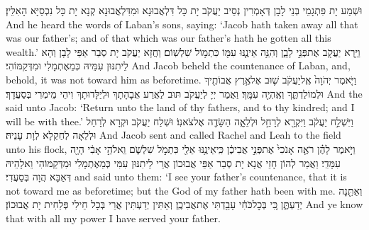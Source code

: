 {וּשְׁמַע יָת פִּתְגָמֵי בְּנֵי לָבָן דְּאָמְרִין נְסֵיב יַעֲקֹב יָת כָּל דִּלְאֲבוּנָא וּמִדִּלְאֲבוּנָא קְנָא יָת כָּל נִכְסַיָּא הָאִלֵּין׃}
{And he heard the words of Laban’s sons, saying: ‘Jacob hath taken away all that was our father’s; and of that which was our father’s hath he gotten all this wealth.’}{}
{וַיַּ֥רְא יַעֲקֹ֖ב אֶת\maqqaf פְּנֵ֣י לָבָ֑ן וְהִנֵּ֥ה אֵינֶ֛נּוּ עִמּ֖וֹ כִּתְמ֥וֹל שִׁלְשֽׁוֹם׃}
{וַחֲזָא יַעֲקֹב יָת סְבַר אַפֵּי לָבָן וְהָא לֵיתִנּוּן עִמֵּיהּ כְּמֵאֶתְמָלִי וּמִדְּקַמּוֹהִי׃}
{And Jacob beheld the countenance of Laban, and, behold, it was not toward him as beforetime.}{}
{וַיֹּ֤אמֶר יְהֹוָה֙ אֶֽל\maqqaf יַעֲקֹ֔ב שׁ֛וּב אֶל\maqqaf אֶ֥רֶץ אֲבוֹתֶ֖יךָ וּלְמוֹלַדְתֶּ֑ךָ וְאֶֽהְיֶ֖ה עִמָּֽךְ׃}
{וַאֲמַר יְיָ לְיַעֲקֹב תּוּב לַאֲרַע אֲבָהָתָךְ וּלְיַלָּדוּתָךְ וִיהֵי מֵימְרִי בְּסַעֲדָךְ׃}
{And the \lord\space said unto Jacob: ‘Return unto the land of thy fathers, and to thy kindred; and I will be with thee.’}{}
{וַיִּשְׁלַ֣ח יַעֲקֹ֔ב וַיִּקְרָ֖א לְרָחֵ֣ל וּלְלֵאָ֑ה הַשָּׂדֶ֖ה אֶל\maqqaf צֹאנֽוֹ׃}
{וּשְׁלַח יַעֲקֹב וּקְרָא לְרָחֵל וּלְלֵאָה לְחַקְלָא לְוָת עָנֵיהּ׃}
{And Jacob sent and called Rachel and Leah to the field unto his flock,}{}
{וַיֹּ֣אמֶר לָהֶ֗ן רֹאֶ֤ה אָנֹכִי֙ אֶת\maqqaf פְּנֵ֣י אֲבִיכֶ֔ן כִּֽי\maqqaf אֵינֶ֥נּוּ אֵלַ֖י כִּתְמֹ֣ל שִׁלְשֹׁ֑ם וֵֽאלֹהֵ֣י אָבִ֔י הָיָ֖ה עִמָּדִֽי׃}
{וַאֲמַר לְהוֹן חָזֵי אֲנָא יָת סְבַר אַפֵּי אֲבוּכוֹן אֲרֵי לֵיתִנּוּן עִמִּי כְּמֵאֶתְמָלִי וּמִדְּקַמּוֹהִי וֵאלָהֵיהּ דְּאַבָּא הֲוָה בְּסַעֲדִי׃}
{and said unto them: ‘I see your father’s countenance, that it is not toward me as beforetime; but the God of my father hath been with me.}{}
{וְאַתֵּ֖נָה יְדַעְתֶּ֑ן כִּ֚י בְּכׇל\maqqaf כֹּחִ֔י עָבַ֖דְתִּי אֶת\maqqaf אֲבִיכֶֽן׃}
{וְאַתִּין יְדַעְתִּין אֲרֵי בְּכָל חֵילִי פְּלַחִית יָת אֲבוּכוֹן׃}
{And ye know that with all my power I have served your father.}{}
